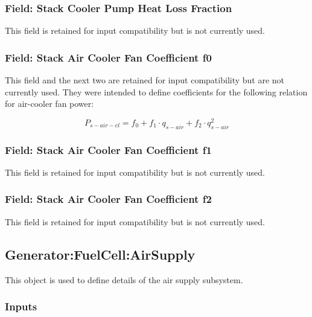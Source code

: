 \subsubsection{Field: Stack Cooler Pump Heat Loss Fraction}\label{field-stack-cooler-pump-heat-loss}

This field is retained for input compatibility but is not currently used.

\subsubsection{Field: Stack Air Cooler Fan Coefficient f0}\label{field-stack-air-cooler-fan-coefficient-f0}

This field and the next two are retained for input compatibility but are not currently used. They were intended to define coefficients for the following relation for air-cooler fan power:

\begin{equation}
{P_{s - air - el}} = {f_0} + {f_1} \cdot {q_{s - air}} + {f_2} \cdot q_{s - air}^2
\end{equation}

\subsubsection{Field: Stack Air Cooler Fan Coefficient f1}\label{field-stack-air-cooler-fan-coefficient-f1}

This field is retained for input compatibility but is not currently used.

\subsubsection{Field: Stack Air Cooler Fan Coefficient f2}\label{field-stack-air-cooler-fan-coefficient-f2}

This field is retained for input compatibility but is not currently used.

\subsection{Generator:FuelCell:AirSupply}\label{generatorfuelcellairsupply}

This object is used to define details of the air supply subsystem.

\subsubsection{Inputs}\label{inputs-14-003}

